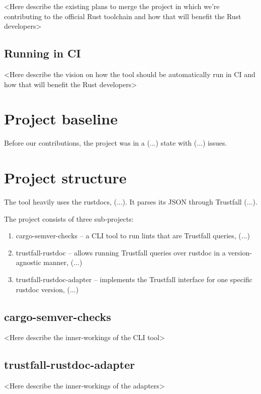 \documentclass[licencjacka,en]{pracamgr}
\begin{document}
<Here describe the existing plans to merge the project in which we're contributing
to the official Rust toolchain and how that will benefit the Rust developers>

\section{Running in CI}

<Here describe the vision on how the tool should be automatically run in CI
and how that will benefit the Rust developers>

\chapter{Project baseline}\label{r:baseline}

Before our contributions, the project was in a (...) state
with (...) issues.

\chapter{Project structure}\label{r:structure}

The tool heavily uses the rustdocs, (...).
It parses its JSON through Trustfall (...).

The project consists of three sub-projects:
\begin{enumerate}
	\item cargo-semver-checks -- a CLI tool to run lints that are Trustfall queries, (...)
	\item trustfall-rustdoc -- allows running Trustfall queries over rustdoc in a version-agnostic manner, (...)
	\item trustfall-rustdoc-adapter -- implements the Trustfall interface for one specific rustdoc version, (...)
\end{enumerate}

\section{cargo-semver-checks}

<Here describe the inner-workings of the CLI tool>

\section{trustfall-rustdoc-adapter}

<Here describe the inner-workings of the adapters>
\end{document}
